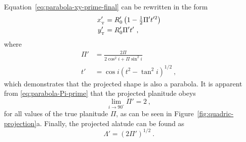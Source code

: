 Equation~\eqref{eq:parabola-xy-prime-final} can be rewritten in the
form
\begin{gather}
  \label{eq:parabola-xy-all-primes}
  \begin{aligned}
    x_{_{\mathrm{\scriptscriptstyle T}}}' &= R_0' \left(1  - \tfrac{1}{2} \Pi' t'^2\right) \\
    y_{_{\mathrm{\scriptscriptstyle T}}}' &= R_0' \Pi' t' \ ,
  \end{aligned}
\end{gather}
where
\begin{align}
  \label{eq:parabola-Pi-prime}
  \Pi' &= \frac{2 \Pi} {2 \cos^2 i + \Pi \sin^2 i} \\
  \label{eq:parabola-t-prime}
  t' &= \cos i \left(t^2 - \tan^2 i\right)^{1/2} \ ,
\end{align}
which demonstrates that the projected shape is also a parabola. It is
apparent from \eqref{eq:parabola-Pi-prime} that the projected
planitude obeys
\begin{equation*}
\lim_{i \to 90^\circ} \Pi' = 2 \ ,
\end{equation*}
for all values of the true planitude \(\Pi\), as can be seen in
Figure~\ref{fig:quadric-projection}a.  Finally, the projected alatude
can be found as
\begin{equation}
  \label{eq:parabola-Lambda-prime}
  \Lambda' = \left( 2 \Pi' \right)^{1/2} \ .
\end{equation}
